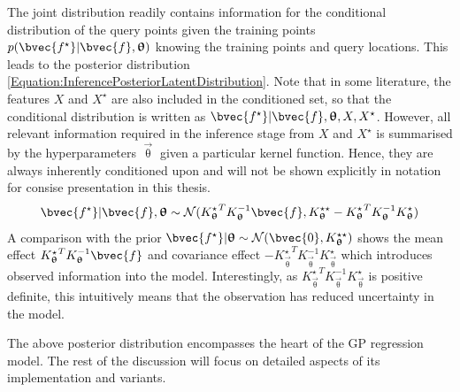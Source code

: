 				The joint distribution readily contains information for the conditional distribution of the query points given the training points $p(\bvec{f^{\star}} | \bvec{f}, \vec{\uptheta})$ knowing the training points and query locations. This leads to the posterior distribution \eqref{Equation:InferencePosteriorLatentDistribution}. Note that in some literature, the features $X$ and $X^{\star}$ are also included in the conditioned set, so that the conditional distribution is written as $\bvec{f^{\star}} | \bvec{f}, \vec{\uptheta}, X, X^{\star}$. However, all relevant information required in the inference stage from $X$ and $X^{\star}$ is summarised by the hyperparameters $\vec{\uptheta}$ given a particular kernel function. Hence, they are always inherently conditioned upon and will not be shown explicitly in notation for consise presentation in this thesis. \begin{equation}
					\bvec{f^{\star}} | \bvec{f}, \vec{\uptheta} \sim \mathcal{N}({K_{\vec{\uptheta}}^{\star}}^{T} K_{\vec{\uptheta}}^{-1} \bvec{f}, K_{\vec{\uptheta}}^{\star \star} - {K_{\vec{\uptheta}}^{\star}}^{T} K_{\vec{\uptheta}}^{-1} K_{\vec{\uptheta}}^{\star})
				\label{Equation:InferencePosteriorLatentDistribution}
				\end{equation} A comparison with the prior $\bvec{f^{\star}} | \vec{\uptheta} \sim \mathcal{N}(\bvec{0}, K_{\vec{\uptheta}}^{\star \star})$ shows the mean effect ${K_{\vec{\uptheta}}^{\star}}^{T} K_{\vec{\uptheta}}^{-1} \bvec{f}$ and covariance effect $- {K_{\vec{\uptheta}}^{\star}}^{T} K_{\vec{\uptheta}}^{-1} K_{\vec{\uptheta}}^{\star}$ which introduces observed information into the model. Interestingly, as ${K_{\vec{\uptheta}}^{\star}}^{T} K_{\vec{\uptheta}}^{-1} K_{\vec{\uptheta}}^{\star}$ is positive definite, this intuitively means that the observation has reduced uncertainty in the model.
				
				The above posterior distribution encompasses the heart of the GP regression model. The rest of the discussion will focus on detailed aspects of its implementation and variants.
				
